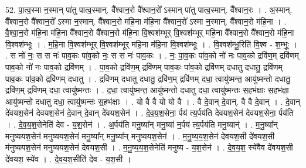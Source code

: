 \documentclass[17pt]{extarticle}
\begin{document}
52. पा॒त्व॒स्मा न॒स्मान् पा॑तु पात्व॒स्मान्. वै᳚श्वान॒रो वै᳚श्वान॒रो᳚ ऽस्मान् पा॑तु पात्व॒स्मान्. वै᳚श्वान॒रः । . अ॒स्मान्. वै᳚श्वान॒रो वै᳚श्वान॒रो᳚ ऽस्मा न॒स्मान्. वै᳚श्वान॒रो म॑हि॒ना म॑हि॒ना वै᳚श्वान॒रो᳚ ऽस्मा न॒स्मान्. वै᳚श्वान॒रो म॑हि॒ना । . वै॒श्वा॒न॒रो म॑हि॒ना म॑हि॒ना वै᳚श्वान॒रो वै᳚श्वान॒रो म॑हि॒ना वि॒श्वश॑म्भूर् वि॒श्वश॑म्भूर् महि॒ना वै᳚श्वान॒रो वै᳚श्वान॒रो म॑हि॒ना वि॒श्वश॑म्भूः । . म॒हि॒ना वि॒श्वश॑म्भूर् वि॒श्वश॑म्भूर् महि॒ना म॑हि॒ना वि॒श्वश॑म्भूः । . वि॒श्वश॑म्भू॒रिति॑ वि॒श्व - श॒म्भूः॒ । . स नो॑ नः॒ स स नः॑ पाव॒कः पा॑व॒को नः॒ स स नः॑ पाव॒कः । . नः॒ पा॒व॒कः पा॑व॒को नो॑ नः पाव॒को द्रवि॑ण॒म् द्रवि॑णम् पाव॒को नो॑ नः पाव॒को द्रवि॑णम् । . पा॒व॒को द्रवि॑ण॒म् द्रवि॑णम् पाव॒कः पा॑व॒को द्रवि॑णम् दधातु दधातु॒ द्रवि॑णम् पाव॒कः पा॑व॒को द्रवि॑णम् दधातु । . द्रवि॑णम् दधातु दधातु॒ द्रवि॑ण॒म् द्रवि॑णम् दधा॒ त्वायु॑ष्मन्त॒ आयु॑ष्मन्तो दधातु॒ द्रवि॑ण॒म् द्रवि॑णम् दधा॒ त्वायु॑ष्मन्तः । . द॒धा॒ त्वायु॑ष्मन्त॒ आयु॑ष्मन्तो दधातु दधा॒ त्वायु॑ष्मन्तः स॒हभ॑क्षाः स॒हभ॑क्षा॒ आयु॑ष्मन्तो दधातु दधा॒ त्वायु॑ष्मन्तः स॒हभ॑क्षाः । . यो वै वै यो यो वै । . वै दे॒वान् दे॒वान्. वै वै दे॒वान् । . दे॒वान् दे॑वयश॒सेन॑ देवयश॒सेन॑ दे॒वान् दे॒वान् दे॑वयश॒सेन॑ । . दे॒व॒य॒श॒सेना॒ र्पय॑ त्य॒र्पय॑ति देवयश॒सेन॑ देवयश॒सेना॒ र्पय॑ति । . दे॒व॒य॒श॒सेनेति॑ देव - य॒श॒सेन॑ । . अ॒र्पय॑ति मनु॒ष्या᳚न् मनु॒ष्या॑ न॒र्पय॑ त्य॒र्पय॑ति मनु॒ष्यान्॑ । . म॒नु॒ष्या᳚न् मनुष्ययश॒सेन॑ मनुष्ययश॒सेन॑ मनु॒ष्या᳚न् मनु॒ष्या᳚न् मनुष्ययश॒सेन॑ । . म॒नु॒ष्य॒य॒श॒सेन॑ देवयश॒सी दे॑वयश॒सी म॑नुष्ययश॒सेन॑ मनुष्ययश॒सेन॑ देवयश॒सी । . म॒नु॒ष्य॒य॒श॒सेनेति॑ मनुष्य - य॒श॒सेन॑ । . दे॒व॒य॒श॒ स्ये॑वैव दे॑वयश॒सी दे॑वयश॒ स्ये॑व । . दे॒व॒य॒श॒सीति॑ देव - य॒श॒सी । \newline
\end{document}
